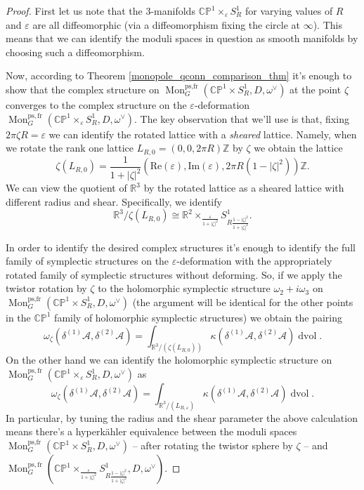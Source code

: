 \documentclass[11pt, oneside, reqno]{amsart}
\theoremstyle{definition} \newtheorem{definition}{Definition}[section]
\theoremstyle{definition} \newtheorem{remark}[definition]{Remark}
\theoremstyle{definition} \newtheorem{remarks}[definition]{Remarks}
\theoremstyle{definition} \newtheorem{question}[definition]{Question}
\theoremstyle{definition} \newtheorem*{note}{Note}
\theoremstyle{definition} \newtheorem{example}[definition]{Example}
\theoremstyle{definition} \newtheorem{examples}[definition]{Examples}
\newcommand{\bb}[1]{\mathbb{#1}}
\newcommand{\mr}[1]{\mathrm{#1}}
\newcommand{\mc}[1]{\mathcal{#1}}
\newcommand{\RR}{\mathbb{R}}
\newcommand{\ZZ}{\mathbb{Z}}
\newcommand{\eps}{\varepsilon}
\newcommand{\iso}{\cong}
\DeclareMathOperator{\dvol}{dvol}
\DeclareMathOperator{\mon}{Mon}
\newcommand{\fr}{\mathrm{fr}}
\begin{document}
\begin{proof}
First let us note that the 3-manifolds $\bb{CP}^1 \times_\eps S^1_R$ for varying values of $R$ and $\eps$ are all diffeomorphic (via a diffeomorphism fixing the circle at $\infty$).  This means that we can identify the moduli spaces in question as smooth manifolds by choosing such a diffeomorphism.  

Now, according to Theorem \ref{monopole_qconn_comparison_thm} it's enough to show that the complex structure on $\mon_G^{\text{ps,fr}}(\bb{CP}^1 \times S^1_R,D,\omega^\vee)$ at the point $\zeta$ converges to the complex structure on the $\eps$-deformation $\mon_G^{\mr{ps},\fr}(\bb{CP}^1 \times_\eps S^1_R,D,\omega^\vee)$.  The key observation that we'll use is that, fixing $2 \pi \zeta R = \eps$ we can identify the rotated lattice with a \emph{sheared} lattice.  Namely, when we rotate the rank one lattice $L_{R,0} = (0,0,2\pi R)\ZZ$ by $\zeta$ we obtain the lattice
\[\zeta(L_{R,0}) = \frac {1}{1+|\zeta|^2} (\mr{Re}(\eps), \mr{Im}(\eps), 2\pi R (1-|\zeta|^2) )\ZZ.\]
We can view the quotient of $\RR^3$ by the rotated lattice as a sheared lattice with different radius and shear.  Specifically, we identify
\[\RR^3 / \zeta(L_{R,0}) \iso \RR^2 \times_{\frac{\eps}{1+|\zeta|^2}} S^1_{R \frac {1-|\zeta|^2}{1+|\zeta|^2}}.\]

In order to identify the desired complex structures it's enough to identify the full family of symplectic structures on the $\eps$-deformation with the appropriately rotated family of symplectic structures without deforming.  So, if we apply the twistor rotation by $\zeta$ to the holomorphic symplectic structure $\omega_2 + i\omega_3$ on $\mon_G^{\text{ps,fr}}(\bb{CP}^1 \times S^1_R,D,\omega^\vee)$ (the argument will be identical for the other points in the $\bb{CP}^1$ family of holomorphic symplectic structures) we obtain the pairing
\[\omega_\zeta(\delta^{(1)}\mc A, \delta^{(2)}\mc A) = \int_{\RR^3/(\zeta(L_{R,0}))} \kappa(\delta^{(1)} \mc A, \delta^{(2)} \mc A) \dvol.\]
On the other hand we can identify the holomorphic symplectic structure on $\mon_G^{\mr{ps},\fr}(\bb{CP}^1 \times_\eps S^1_R,D,\omega^\vee)$ as
\[\omega_\zeta(\delta^{(1)}\mc A, \delta^{(2)}\mc A) = \int_{\RR^3/(L_{R,\eps})} \kappa(\delta^{(1)} \mc A, \delta^{(2)} \mc A) \dvol.\]
In particular, by tuning the radius and the shear parameter the above calculation means there's a hyperk\"ahler equivalence between the moduli spaces $\mon_G^{\text{ps,fr}}(\bb{CP}^1 \times S^1_R,D,\omega^\vee)$ -- after rotating the twistor sphere by $\zeta$ -- and $\mon_G^{\mr{ps},\fr}(\bb{CP}^1 \times_{\frac{\eps}{1+|\zeta|^2}} S^1_{R \frac {1-|\zeta|^2}{1+|\zeta|^2}},D,\omega^\vee)$.  


\end{proof}
\end{document}
